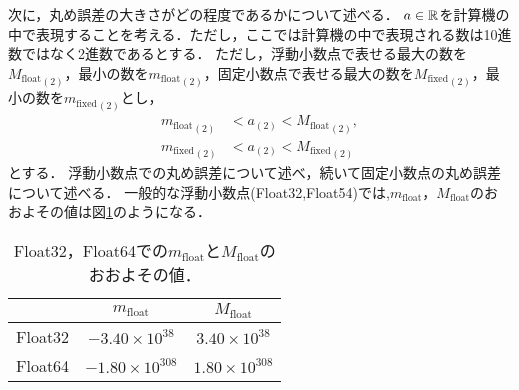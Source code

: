 次に，丸め誤差の大きさがどの程度であるかについて述べる．
$a \in \mathbb{R}$を計算機の中で表現することを考える．ただし，ここでは計算機の中で表現される数は10進数ではなく2進数であるとする．
ただし，浮動小数点で表せる最大の数を${M_{\mathrm{float}}}_{(2)}$，最小の数を${m_{\mathrm{float}}}_{(2)}$，固定小数点で表せる最大の数を${M_{\mathrm{fixed}}}_{(2)}$，最小の数を${m_{\mathrm{fixed}}}_{(2)}$とし，
\begin{align*}
   {m_{\mathrm{float}}}_{(2)} &< a_{(2)} < {M_{\mathrm{float}}}_{(2)}, \\
   {m_{\mathrm{fixed}}}_{(2)} &< a_{(2)} < {M_{\mathrm{fixed}}}_{(2)}
\end{align*}
とする．
浮動小数点での丸め誤差について述べ，続いて固定小数点の丸め誤差について述べる．
一般的な浮動小数点(Float32,Float54)では,$m_{\mathrm{float}}$，$M_{\mathrm{float}}$のおおよその値は図\ref{tab:float_max_min}のようになる．
\begin{table}[H]
    \centering
    \caption{Float32，Float64での$m_{\mathrm{float}}$と$M_{\mathrm{float}}$のおおよその値．}
    \begin{tabular}{c|c|c}
         & $m_{\mathrm{float}}$ & $M_{\mathrm{float}}$ \\ \hline \hline
         Float32 & $-3.40 \times 10^{38}$ & $3.40 \times 10^{38}$ \\ \hline
         Float64 & $-1.80 \times 10^{308}$ & $1.80 \times 10^{308}$
    \end{tabular}
    \label{tab:float_max_min}
\end{table}

